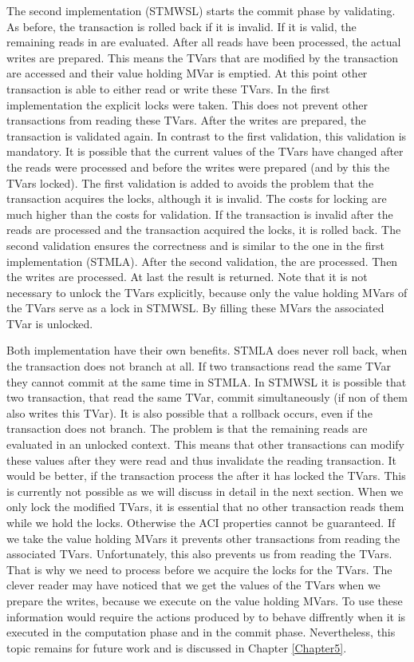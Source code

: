 The second implementation (STMWSL) starts the commit phase by validating. As before, the 
transaction is rolled back if it is invalid. If it is valid, the remaining reads in 
 are evaluated. After all reads have been processed, the actual writes are
prepared. This means the TVars that are modified by the transaction are accessed and
their value holding MVar is emptied. At this point other transaction is able to 
either read or write these TVars. In the first implementation the explicit locks 
were taken. This does not prevent other transactions from reading these TVars.
After the writes are prepared, the transaction is validated again. In contrast to 
the first validation, this validation is mandatory. It is possible that the current
values of the TVars have changed after the reads were processed and before the 
writes were prepared (and by this the TVars locked). The first validation is
added to avoids the problem that the transaction acquires the locks, although it 
is invalid. The costs for locking are much higher than the costs for validation.
If the transaction is invalid after the reads are processed and the transaction
acquired the locks, it is rolled back. The second validation ensures the correctness
and is similar to the one in the first implementation (STMLA). After the second validation, 
the  are processed. Then the writes are processed. At last the result is returned. Note that
it is not necessary to unlock the TVars explicitly, because only the value 
holding MVars of the TVars serve as a lock in STMWSL. By filling these MVars
the associated TVar is unlocked. 

Both implementation have their own benefits. STMLA does never roll back,
when the transaction does not branch at all. If two transactions read the
same TVar they cannot commit at the same time in STMLA. In STMWSL it is
possible that two transaction, that read the same TVar, commit simultaneously
(if non of them also writes this TVar). It is also possible
that a rollback occurs, even if the transaction does not branch. The 
problem is that the remaining reads are evaluated in an unlocked context.
This means that other transactions can modify these values after they were 
read and thus invalidate the reading transaction. It would be better, if the
transaction process the  after it has locked the TVars. This is 
currently not possible as we will discuss in detail in the next section. When 
we only lock the modified TVars, it is essential that no other transaction 
reads them while we hold the locks. Otherwise the ACI properties cannot be 
guaranteed. If we take the value holding MVars it prevents other transactions
from reading the associated TVars. Unfortunately, this also prevents us from 
reading the TVars. That is why we need to process  before we 
acquire the locks for the TVars. The clever reader may have noticed that 
we get the values of the TVars when we prepare the writes, because we execute
 on the value holding MVars. To use these information would 
require the  actions produced by  to 
behave diffrently when it is executed in the computation phase and in the 
commit phase. Nevertheless, this topic remains for future work and is discussed 
in Chapter \ref{Chapter5}.

